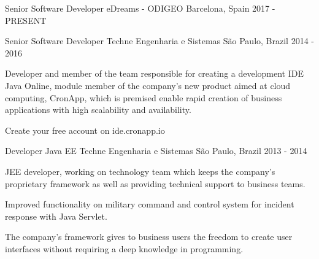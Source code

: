 

\begin{cventries}

  \cventry
    {Senior Software Developer} %
    {eDreams - ODIGEO} %
    {Barcelona, Spain} %
    {2017 - PRESENT} %
    {
      \begin{cvitems} %
      \end{cvitems}
    }

  \cventry
    {Senior Software Developer} %
    {Techne Engenharia e Sistemas} %
    {São Paulo, Brazil} %
    {2014 - 2016} %
    {
      \begin{cvitems} %
        \item {Developer and member of the team responsible for creating a development IDE Java Online, module member of the company's new product aimed at cloud computing, CronApp, which is premised enable rapid creation of business applications with high scalability and availability.}
        \item {Create your free account on ide.cronapp.io}
      \end{cvitems}
    }

  \cventry
    {Developer Java EE} %
    {Techne Engenharia e Sistemas} %
    {São Paulo, Brazil} %
    {2013 - 2014} %
    {
      \begin{cvitems} %
        \item {JEE developer, working on technology team which keeps the company's proprietary framework as well as providing technical support to business teams.}
        \item {Improved functionality on military command and control system for incident response with Java Servlet.}
        \item {The company's framework gives to business users the freedom to create user interfaces without requiring a deep knowledge in programming.}
      \end{cvitems}
    }


\end{cventries}
